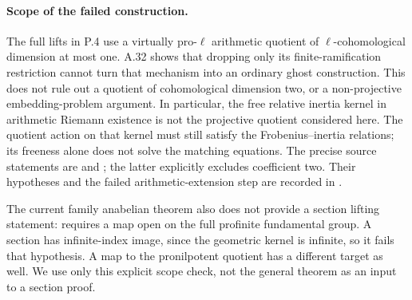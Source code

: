 \paragraph{Scope of the failed construction.}
The full lifts in P.4 use a virtually pro-\(\ell\) arithmetic
quotient of \(\ell\)-cohomological dimension at most one.
A.32 shows that dropping only its finite-ramification restriction
cannot turn that mechanism into an ordinary ghost construction.
This does not rule out a quotient of cohomological dimension two,
or a non-projective embedding-problem argument. In particular, the
free relative inertia kernel in arithmetic Riemann existence is not
the projective quotient considered here. The quotient action on
that kernel must still satisfy the Frobenius--inertia relations;
its freeness alone does not solve the matching equations.
The precise source statements are
\citet[Proposition~8.1 and Corollary~8.2, pp.~467--468]{RootSchmidt2007}
and \citet[Theorem~1.1 and Remarks~1.2, author p.~2]{RootSchmidt2010};
the latter explicitly excludes coefficient two. Their hypotheses and
the failed arithmetic-extension step are recorded in
.

The current family anabelian theorem also does not provide a section
lifting statement:
\citet[Theorem~A, p.~2]{RootHolzschuhSchmidtStix2026} requires
a map open on the full profinite fundamental group. A section has
infinite-index image, since the geometric kernel is infinite, so it
fails that hypothesis. A map to the pronilpotent quotient has a
different target as well. We use only this explicit scope check,
not the general theorem as an input to a section proof.

